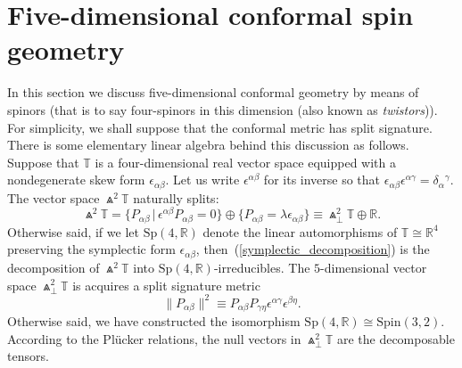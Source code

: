 \documentclass[10pt,a4paper]{amsart}
\numberwithin{equation}{section}
\begin{document}
\section{Five-dimensional conformal spin geometry}\label{5d_conformal}
In this section we discuss five-dimensional conformal geometry by means of
spinors (that is to say four-spinors in this dimension (also known as
{\em twistors})). For simplicity, we shall suppose that the conformal metric
has split signature. There is some elementary linear algebra behind this
discussion as follows. Suppose that ${\mathbb{T}}$ is a four-dimensional real
vector space equipped with a nondegenerate skew form $\epsilon_{\alpha\beta}$.
Let us write $\epsilon^{\alpha\beta}$ for its inverse so that
$\epsilon_{\alpha\beta}\epsilon^{\alpha\gamma}=\delta_\alpha{}^\gamma$. The
vector space $\Wedge^2{\mathbb{T}}$ naturally splits:
\begin{equation}\label{symplectic_decomposition}
\Wedge^2{\mathbb{T}}
=\big\{P_{\alpha\beta}\,|\,\epsilon^{\alpha\beta}P_{\alpha\beta}=0\big\}
\oplus\{P_{\alpha\beta}=\lambda\epsilon_{\alpha\beta}\}
\equiv\Wedge_\perp^2{\mathbb{T}}\oplus{\mathbb{R}}.\end{equation}
Otherwise said, if we let ${\mathrm{Sp}}(4,{\mathbb{R}})$ denote the linear
automorphisms of ${\mathbb{T}}\cong{\mathbb{R}}^4$ preserving the symplectic
form $\epsilon_{\alpha\beta}$, then~(\ref{symplectic_decomposition}) is the
decomposition of $\Wedge^2{\mathbb{T}}$ into
${\mathrm{Sp}}(4,{\mathbb{R}})$-irreducibles. The $5$-dimensional vector space
$\Wedge_\perp^2{\mathbb{T}}$ is acquires a split signature metric
\[\|P_{\alpha\beta}\|^2\equiv
P_{\alpha\beta}P_{\gamma\eta}\epsilon^{\alpha\gamma}\epsilon^{\beta\eta}.\]
Otherwise said, we have constructed the isomorphism
${\mathrm{Sp}}(4,{\mathbb{R}})\cong{\mathrm{Spin}}(3,2)$. According to the
Pl\"ucker relations, the null vectors in $\Wedge_\perp^2{\mathbb{T}}$ are
the decomposable tensors.
\end{document}
